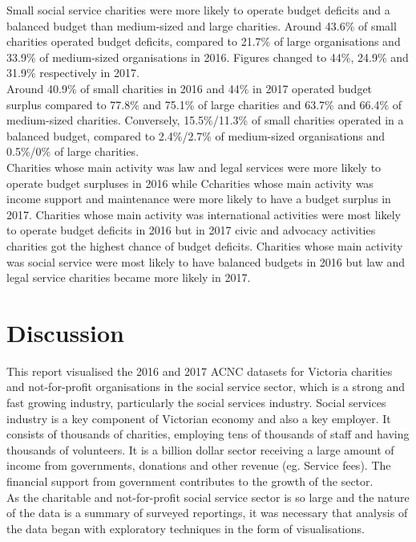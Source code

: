 \documentclass[
  11pt,
]{article}
\begin{document}
Small social service charities were more likely to operate budget deficits and a balanced budget than medium-sized and large charities. Around 43.6\% of small charities operated budget deficits, compared to 21.7\% of large organisations and 33.9\% of medium-sized organisations in 2016. Figures changed to 44\%, 24.9\% and 31.9\% respectively in 2017.\\
Around 40.9\% of small charities in 2016 and 44\% in 2017 operated budget surplus compared to 77.8\% and 75.1\% of large charities and 63.7\% and 66.4\% of medium-sized charities. Conversely, 15.5\%/11.3\% of small charities operated in a balanced budget, compared to 2.4\%/2.7\% of medium-sized organisations and 0.5\%/0\% of large charities.\\
Charities whose main activity was law and legal services were more likely to operate budget surpluses in 2016 while Ccharities whose main activity was income support and maintenance were more likely to have a budget surplus in 2017. Charities whose main activity was international activities were most likely to operate budget deficits in 2016 but in 2017 civic and advocacy activities charities got the highest chance of budget deficits. Charities whose main activity was social service were most likely to have balanced budgets in 2016 but law and legal service charities became more likely in 2017.

\hypertarget{discussion}{%
\section{Discussion}\label{discussion}}

This report visualised the 2016 and 2017 ACNC datasets for Victoria charities and not-for-profit organisations in the social service sector, which is a strong and fast growing industry, particularly the social services industry. Social services industry is a key component of Victorian economy and also a key employer. It consists of thousands of charities, employing tens of thousands of staff and having thousands of volunteers. It is a billion dollar sector receiving a large amount of income from governments, donations and other revenue (eg. Service fees). The financial support from government contributes to the growth of the sector.\\
As the charitable and not-for-profit social service sector is so large and the nature of the data is a summary of surveyed reportings, it was necessary that analysis of the data began with exploratory techniques in the form of visualisations.
\end{document}
